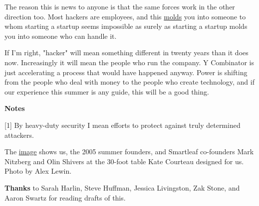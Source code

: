 The reason this is news to anyone is that the same forces work in
the other direction too. Most hackers are 
employees, and this \href{http://software.ericsink.com/entries/No\_Great\_Hackers.html}{molds}
you into someone to whom starting a startup seems impossible as
surely as starting a startup molds you into someone who can handle
it.

If I'm right, "hacker" will mean something different in twenty years
than it does now. Increasingly it will mean the people who run the
company.  Y Combinator is just accelerating a process that would
have happened anyway.  Power is shifting from the people who deal
with money to the people who create technology, and if our experience
this summer is any guide, this will be a good thing.



\textbf{Notes}

[1] By heavy-duty security I mean efforts to protect against truly
determined attackers.

The \href{https://sep.turbifycdn.com/ty/cdn/paulgraham/sfptable.jpg?t=1688221954\&}{image}
shows us, the 2005 summer founders, and Smartleaf
co-founders Mark Nitzberg and Olin Shivers at the 30-foot table 
Kate Courteau designed for us. Photo by Alex Lewin.

\textbf{Thanks} to Sarah Harlin, Steve Huffman, Jessica Livingston,
Zak Stone, and Aaron Swartz for reading drafts of this.




